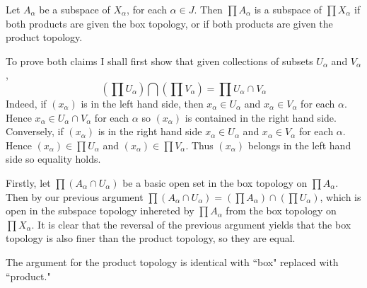 \documentclass[12pt, a4paper, twoside, openright, titlepage]{book}
\begin{document}
\begin{thm}{}{}
    Let $A_{\alpha}$ be a subspace of $X_{\alpha}$, for each $\alpha \in J$. Then $\prod A_{\alpha}$ is a subspace of $\prod X_{\alpha}$ if both products are given the box topology, or if both products are given the product topology.
\end{thm}
\begin{proof*}{}{}
    To prove both claims I shall first show that given collections of subsets $U_{\alpha}$ and $V_{\alpha}$, \begin{equation*}
        \left(\prod U_{\alpha}\right)\bigcap\left(\prod V_{\alpha}\right) = \prod U_{\alpha}\cap V_{\alpha}
    \end{equation*}
    Indeed, if $(x_{\alpha})$ is in the left hand side, then $x_{\alpha} \in U_{\alpha}$ and $x_{\alpha} \in V_{\alpha}$ for each $\alpha$. Hence $x_{\alpha} \in U_{\alpha}\cap V_{\alpha}$ for each $\alpha$ so $(x_{\alpha})$ is contained in the right hand side. Conversely, if $(x_{\alpha})$ is in the right hand side $x_{\alpha} \in U_{\alpha}$ and $x_{\alpha} \in V_{\alpha}$ for each $\alpha$. Hence $(x_{\alpha}) \in \prod U_{\alpha}$ and $(x_{\alpha}) \in \prod V_{\alpha}$. Thus $(x_{\alpha})$ belongs in the left hand side so equality holds.

    Firstly, let $\prod (A_{\alpha}\cap U_{\alpha})$ be a basic open set in the box topology on $\prod A_{\alpha}$. Then by our previous argument $\prod (A_{\alpha}\cap U_{\alpha}) = \left(\prod A_{\alpha}\right)\cap\left(\prod U_{\alpha}\right)$, which is open in the subspace topology inhereted by $\prod A_{\alpha}$ from the box topology on $\prod X_{\alpha}$. It is clear that the reversal of the previous argument yields that the box topology is also finer than the product topology, so they are equal.

    The argument for the product topology is identical with ``box" replaced with ``product."
\end{proof*}
\end{document}
